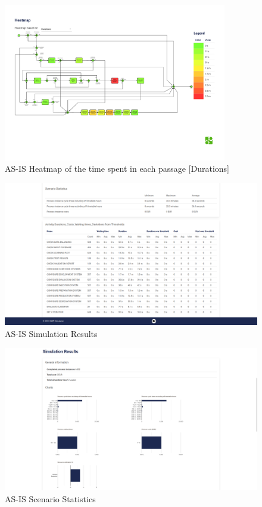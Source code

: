 \begin{figure}[H]
    \centering
    \includegraphics[width=0.87\textwidth]{figures/AS-IS heatmap_durations.pdf}
    \caption{AS-IS Heatmap of the time spent in each passage [Durations]}
    \label{fig:as_is_heatmap_durations}
\end{figure}

\begin{figure}[H]
    \centering
    \includegraphics[width=1\textwidth]{figures/AS-IS Simulation Results.png}
    \caption{AS-IS Simulation Results}
    \label{fig:as_is_simulation_results}
\end{figure}

\begin{figure}[H]
    \centering
    \includegraphics[width=1\textwidth]{figures/AS-IS Scenario Statistics.png}
    \caption{AS-IS Scenario Statistics}
    \label{fig:as_is_scenario_Statistics}
\end{figure}


